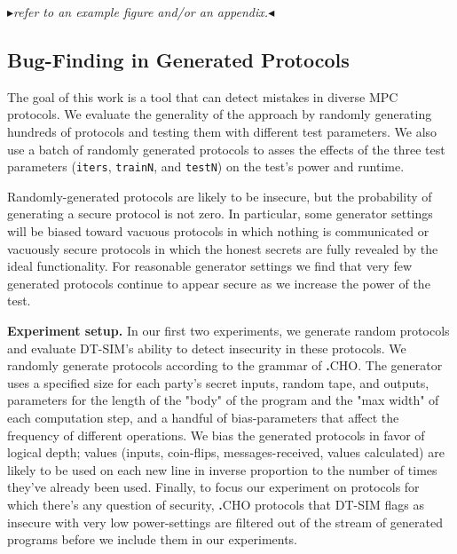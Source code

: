 \documentclass[compsoc, conference, a4paper, 10pt, times]{IEEEtran}
\renewcommand{\paragraph}[1]{\vspace*{2pt}\noindent\textbf{#1}}
\newcommand{\langname}{\textsc{\textbf{.}CHO}\xspace}
\newcommand{\toolname}{\textsc{DT-SIM}\xspace}
\newcommand{\mynote}[2]
    {{\color{red} \fbox{\bfseries\sffamily\scriptsize#1}
    {\small$\blacktriangleright$\textsf{\emph{#2}}$\blacktriangleleft$}}~}
\newcommand{\todo}[1]{\mynote{TODO}{#1}}
\begin{document}
\todo{refer to an example figure and/or an appendix.}

\subsection{Bug-Finding in Generated Protocols}
\label{sec:random-protocols}

The goal of this work is a tool that can detect mistakes in diverse MPC protocols.
We evaluate the generality of the approach by randomly generating hundreds of protocols and testing them with different test parameters.
We also use a batch of randomly generated protocols to asses the effects of the three test parameters
(\texttt{iters}, \texttt{trainN}, and \texttt{testN})
on the test's power and runtime.

Randomly-generated protocols are likely to be insecure, but the probability of generating a secure protocol is not zero.
In particular, some generator settings will be biased toward vacuous protocols in which nothing is communicated
or vacuously secure protocols in which the honest secrets are fully revealed by the ideal functionality.
For reasonable generator settings we find that very few generated protocols
continue to appear secure as we increase the power of the test.

\paragraph{Experiment setup.}
In our first two experiments, we generate random protocols and evaluate \toolname's ability to detect insecurity in these protocols.
We randomly generate protocols according to the grammar of \langname.
The generator uses a specified size for each party's secret inputs, random tape, and outputs,
parameters for the length of the "body" of the program and the "max width" of each computation step,
and a handful of bias-parameters that affect the frequency of different operations.
We bias the generated protocols in favor of logical depth;
values (inputs, coin-flips, messages-received, values calculated) are likely
to be used on each new line in inverse proportion to the number of times they've already been used.
Finally, to focus our experiment on protocols for which there's any question of security,
\langname protocols that \toolname flags as insecure with very low power-settings
are filtered out of the stream of generated programs before we include them in our experiments.
\end{document}
